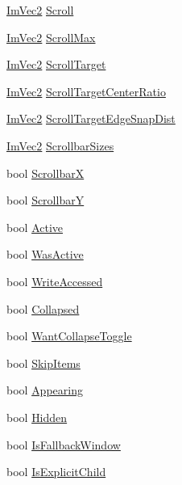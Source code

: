 \begin{DoxyCompactItemize}
\item 
\hyperlink{structImVec2}{Im\+Vec2} \hyperlink{structImGuiWindow_abf20537560b9454a1e39667b8f9e7ff2}{Scroll}
\item 
\hyperlink{structImVec2}{Im\+Vec2} \hyperlink{structImGuiWindow_af0289f66106f5a4443fc17f4284e99c9}{Scroll\+Max}
\item 
\hyperlink{structImVec2}{Im\+Vec2} \hyperlink{structImGuiWindow_a77f86bed14712f73d9fb4b8ba2c4d040}{Scroll\+Target}
\item 
\hyperlink{structImVec2}{Im\+Vec2} \hyperlink{structImGuiWindow_a41f1fde48e59626ea1d19d098cd8ad84}{Scroll\+Target\+Center\+Ratio}
\item 
\hyperlink{structImVec2}{Im\+Vec2} \hyperlink{structImGuiWindow_aa4a1a6f40341140243436c5413a07dcc}{Scroll\+Target\+Edge\+Snap\+Dist}
\item 
\hyperlink{structImVec2}{Im\+Vec2} \hyperlink{structImGuiWindow_a040ebb8ac7de890df6cb6bfe048a72d5}{Scrollbar\+Sizes}
\item 
bool \hyperlink{structImGuiWindow_a5aeada04ca67b0522677f5cdf5c6b483}{ScrollbarX}
\item 
bool \hyperlink{structImGuiWindow_ae95f526590e0777de9cf26581a7d6702}{ScrollbarY}
\item 
bool \hyperlink{structImGuiWindow_a42f141fa0eed059176cb4360df1b1eb2}{Active}
\item 
bool \hyperlink{structImGuiWindow_ab346ec3a2f305948af05ec1871610a8f}{Was\+Active}
\item 
bool \hyperlink{structImGuiWindow_a3c29e870f485d115e7715e149c4dfc4d}{Write\+Accessed}
\item 
bool \hyperlink{structImGuiWindow_a04e6b533b2401d1c7e78b47e31538e7b}{Collapsed}
\item 
bool \hyperlink{structImGuiWindow_a3e26d0e446eb5864d7dacd6847ec8309}{Want\+Collapse\+Toggle}
\item 
bool \hyperlink{structImGuiWindow_ac620c64ec2897561f719db266f5e9b05}{Skip\+Items}
\item 
bool \hyperlink{structImGuiWindow_a158ebb04d20cac09504fdbc4994eb017}{Appearing}
\item 
bool \hyperlink{structImGuiWindow_a49e0f1e5eff5af0df7da7f4d14aedcce}{Hidden}
\item 
bool \hyperlink{structImGuiWindow_af05c51e26301e3245aa8aac0d64f09ab}{Is\+Fallback\+Window}
\item 
bool \hyperlink{structImGuiWindow_aae8365074133751022b381d87da969df}{Is\+Explicit\+Child}
\item 

\end{DoxyCompactItemize}
